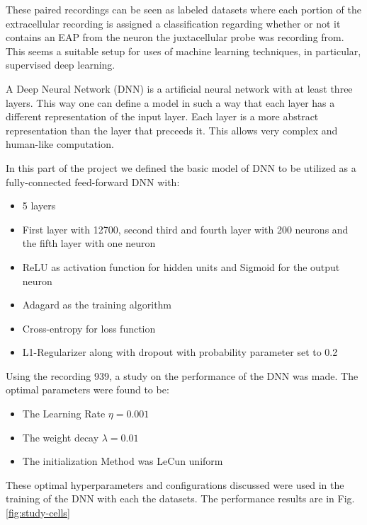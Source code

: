 \documentclass[10pt]{article}
\begin{document}

These paired recordings can be seen as labeled datasets where each portion of the extracellular recording is assigned a classification regarding whether or not it contains an EAP from the neuron the juxtacellular probe was recording from. This seems a suitable setup for uses of machine learning techniques, in particular, supervised deep  learning.

A Deep Neural Network (DNN) is a artificial neural network with at least three layers. This way one can define a model in such a way that each layer has a different representation of the input layer. Each layer is a more abstract representation than the layer that preceeds it. This allows very complex and human-like computation.

In this part of the project we defined the basic model of DNN to be utilized as a fully-connected feed-forward DNN with:
\begin{itemize}
\item 5 layers
\item First layer with 12700, second third and fourth layer with 200 neurons and the fifth layer with one neuron
\item ReLU as activation function for hidden units and Sigmoid for the output neuron
\item Adagard as the training algorithm
\item Cross-entropy for loss function
\item L1-Regularizer along with dropout with probability parameter set to 0.2
\end{itemize}

Using the recording 939, a study on the performance of the DNN was made. The optimal parameters were found to be:
\begin{itemize}
\item The Learning Rate $\eta = 0.001$
\item The weight decay $\lambda = 0.01$
\item The initialization Method was LeCun uniform
\end{itemize}

These optimal hyperparameters and configurations discussed were used in the training of the DNN with each the datasets. The performance results are in Fig. \ref{fig:study-cells}
\end{document}
